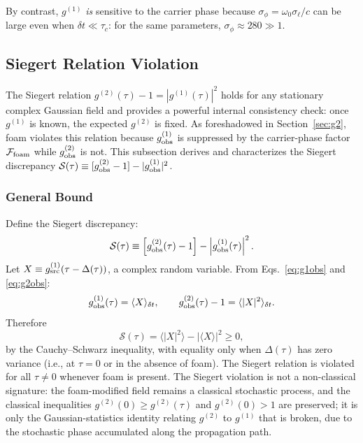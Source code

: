 \documentclass[aps,prd,onecolumn,amsmath,amssymb]{revtex4-2}
\begin{document}
By contrast, $g^{(1)}$ \emph{is} sensitive to the carrier phase because
$\sigma_\phi = \omega_0\sigma_\ell/c$ can be large even when $\delta t \ll \tau_c$:
for the same parameters, $\sigma_\phi \approx 280 \gg 1$.



\subsection{Siegert Relation Violation}
\label{sec:siegert}

The Siegert relation $g^{(2)}(\tau)-1=|g^{(1)}(\tau)|^2$ holds for any
stationary complex Gaussian field and provides a powerful internal consistency
check: once $g^{(1)}$ is known, the expected $g^{(2)}$ is fixed.
As foreshadowed in Section~\ref{sec:g2}, foam violates this relation because
$g^{(1)}_{\rm obs}$ is suppressed by the carrier-phase factor
$\mathcal{F}_{\rm foam}$ while $g^{(2)}_{\rm obs}$ is not.
This subsection derives and characterizes the Siegert discrepancy
$\mathcal{S}(\tau) \equiv [g^{(2)}_{\rm obs}-1] - |g^{(1)}_{\rm obs}|^2$.

\subsubsection{General Bound}

Define the Siegert discrepancy:
\begin{equation}
  \mathcal{S}(\tau)
  \equiv \left[g^{(2)}_{\rm obs}(\tau)-1\right] - \left|g^{(1)}_{\rm obs}(\tau)\right|^2.
  \label{eq:Sdef}
\end{equation}
Let $X \equiv g^{(1)}_{\rm src}(\tau-\Delta(\tau))$, a complex random variable.
From Eqs.~\eqref{eq:g1obs} and \eqref{eq:g2obs}:
\begin{equation}
  g^{(1)}_{\rm obs}(\tau) = \langle X\rangle_{\delta t}, \qquad
  g^{(2)}_{\rm obs}(\tau) - 1 = \langle |X|^2\rangle_{\delta t}.
\end{equation}
Therefore
\begin{equation}
  \mathcal{S}(\tau)
  = \langle |X|^2\rangle - |\langle X\rangle|^2
  \geq 0,
  \label{eq:Svar}
\end{equation}
by the Cauchy--Schwarz inequality, with equality only when $\Delta(\tau)$ has
zero variance (i.e., at $\tau=0$ or in the absence of foam).
The Siegert relation is violated for all $\tau\neq 0$ whenever foam is present.
The Siegert violation is not a non-classical signature: the foam-modified field
remains a classical stochastic process, and the classical inequalities
$g^{(2)}(0)\geq g^{(2)}(\tau)$ and $g^{(2)}(0)>1$ are preserved; it is only
the Gaussian-statistics identity relating $g^{(2)}$ to $g^{(1)}$ that is broken, due to the stochastic phase accumulated along the propagation path.
\end{document}
